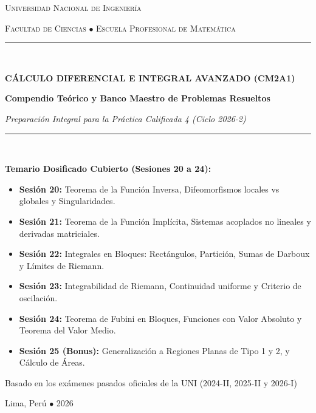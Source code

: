\documentclass[11pt,a4paper]{article}
\begin{document}
\begin{titlepage}
    \centering
    \vspace*{1cm}
    {\scshape\LARGE Universidad Nacional de Ingeniería \par}
    \vspace{0.4cm}
    {\scshape\Large Facultad de Ciencias $\bullet$ Escuela Profesional de Matemática \par}
    \vspace{1.5cm}
    
    \rule{\linewidth}{1.2pt}\\[0.4cm]
    {\huge\bfseries\color{uniblue} CÁLCULO DIFERENCIAL E INTEGRAL AVANZADO (CM2A1)\par}
    \vspace{0.3cm}
    {\Large\textbf{Compendio Teórico y Banco Maestro de Problemas Resueltos}\par}
    \vspace{0.2cm}
    {\large\textit{Preparación Integral para la Práctica Calificada 4 (Ciclo 2026-2)}\par}
    \rule{\linewidth}{1.2pt}\\[1.5cm]
    
    \begin{minipage}{0.9\textwidth}
        \small
        \textbf{Temario Dosificado Cubierto (Sesiones 20 a 24):}
        \begin{itemize}[leftmargin=*, noitemsep]
            \item \textbf{Sesión 20:} Teorema de la Función Inversa, Difeomorfismos locales vs globales y Singularidades.
            \item \textbf{Sesión 21:} Teorema de la Función Implícita, Sistemas acoplados no lineales y derivadas matriciales.
            \item \textbf{Sesión 22:} Integrales en Bloques: Rectángulos, Partición, Sumas de Darboux y Límites de Riemann.
            \item \textbf{Sesión 23:} Integrabilidad de Riemann, Continuidad uniforme y Criterio de oscilación.
            \item \textbf{Sesión 24:} Teorema de Fubini en Bloques, Funciones con Valor Absoluto y Teorema del Valor Medio.
            \item \textbf{Sesión 25 (Bonus):} Generalización a Regiones Planas de Tipo 1 y 2, y Cálculo de Áreas.
        \end{itemize}
    \end{minipage}
    
    \vfill
    {\large Basado en los exámenes pasados oficiales de la UNI (2024-II, 2025-II y 2026-I)\par}
    \vspace{0.5cm}
    {\small Lima, Perú $\bullet$ 2026\par}
\end{titlepage}
\end{document}
